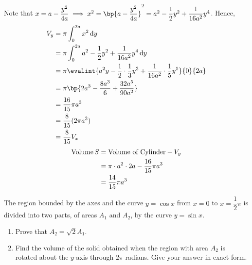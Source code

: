 \documentclass{echw}
\begin{document}
        
        \dash

        Note that $x = a-\dfrac{y^2}{4a} \implies x^2 = \bp{a - \dfrac{y^2}{4a}}^2 = a^2 - \dfrac12 y^2 + \dfrac1{16a^2}y^4$. Hence, 
        {\allowdisplaybreaks
        \begin{align*}
            V_y &= \pi \int_0^{2a} x^2 \d y\\
            &= \pi \int_0^{2a} a^2 - \dfrac12 y^2 + \dfrac1{16a^2}y^4 \d y\\
            &= \pi \evalint{a^2y - \dfrac12 \cdot \dfrac13 y^3 + \dfrac1{16a^2}\cdot \dfrac15 y^5}{0}{2a}\\
            &= \pi \bp{2a^3 - \dfrac{8a^3}6 + \dfrac{32a^5}{90a^2}}\\
            &= \dfrac{16}{15} \pi a^3\\
            &= \dfrac8{15} (2\pi a^3)\\
            &= \dfrac8{15} V_x
        \end{align*}}
        \dash
        \begin{align*}
            \operatorname{Volume} S &= \text{Volume of Cylinder} - V_y\\
            &= \pi \cdot a^2 \cdot 2a - \dfrac{16}{15} \pi a^3\\
            &= \dfrac{14}{15} \pi a^3
        \end{align*}
        

    \problem{}
        The region bounded by the axes and the curve $y = \cos x$ from $x = 0$ to $x = \dfrac12 \pi$ is divided into two parts, of areas $A_1$ and $A_2$, by the curve $y = \sin x$.

        \begin{enumerate}
            \item Prove that $A_2 = \sqrt2 A_1$.
            \item Find the volume of the solid obtained when the region with area $A_2$ is rotated about the $y$-axis through $2\pi$ radians. Give your answer in exact form.
        \end{enumerate}
\end{document}
